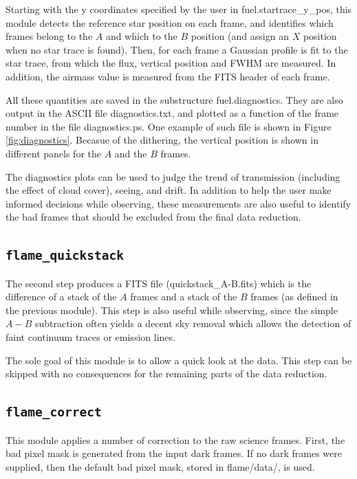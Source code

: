 \documentclass[a4paper, notitlepage]{article}
\begin{document}
Starting with the y coordinates specified by the user in fuel.startrace\_y\_pos, this module detects the reference star position on each frame, and identifies which frames belong to the $A$ and which to the $B$ position (and assign an $X$ position when no star trace is found). Then, for each frame a Gaussian profile is fit to the star trace, from which the flux, vertical position and FWHM are measured. In addition, the airmass value is measured from the FITS header of each frame.

All these quantities are saved in the substructure fuel.diagnostics. They are also output in the ASCII file diagnostics.txt, and plotted as a function of the frame number in the file diagnostics.ps. One example of such file is shown in Figure \ref{fig:diagnostics}. Becasue of the dithering, the vertical position is shown in different panels for the $A$ and the $B$ frames.

The diagnostics plots can be used to judge the trend of transmission (including the effect of cloud cover), seeing, and drift. In addition to help the user make informed decisions while observing, these measurements are also useful to identify the bad frames that should be excluded from the final data reduction.



\subsection{\texttt{flame\_quickstack}}

The second step produces a FITS file (quickstack\_A-B.fits) which is the difference of a stack of the $A$ frames and a stack of the $B$ frames (as defined in the previous module). This step is also useful while observing, since the simple $A-B$ subtraction often yields a decent sky removal which allows the detection of faint continuum traces or emission lines.

The sole goal of this module is to allow a quick look at the data. This step can be skipped with no consequences for the remaining parts of the data reduction.



\subsection{\texttt{flame\_correct}}

This module applies a number of correction to the raw science frames. First, the bad pixel mask is generated from the input dark frames. If no dark frames were supplied, then the default bad pixel mask, stored in flame/data/, is used.
\end{document}
